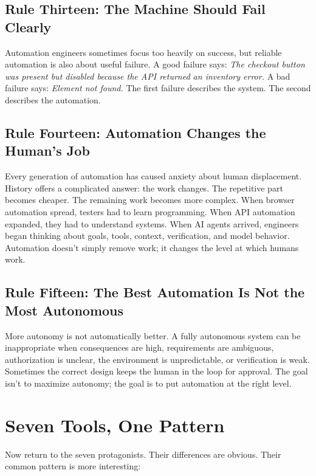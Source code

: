 \documentclass[11pt,twoside]{book}
\begin{document}
\section*{Rule Thirteen: The Machine Should Fail Clearly}

Automation engineers sometimes focus too heavily on success, but reliable automation is also about useful failure. A good failure says: \emph{The checkout button was present but disabled because the API returned an inventory error.} A bad failure says: \emph{Element not found.} The first failure describes the system. The second describes the automation.

\section*{Rule Fourteen: Automation Changes the Human's Job}

Every generation of automation has caused anxiety about human displacement. History offers a complicated answer: the work changes. The repetitive part becomes cheaper. The remaining work becomes more complex. When browser automation spread, testers had to learn programming. When API automation expanded, they had to understand systems. When AI agents arrived, engineers began thinking about goals, tools, context, verification, and model behavior. Automation doesn't simply remove work; it changes the level at which humans work.

\section*{Rule Fifteen: The Best Automation Is Not the Most Autonomous}

More autonomy is not automatically better. A fully autonomous system can be inappropriate when consequences are high, requirements are ambiguous, authorization is unclear, the environment is unpredictable, or verification is weak. Sometimes the correct design keeps the human in the loop for approval. The goal isn't to maximize autonomy; the goal is to put automation at the right level.

\chapter*{Seven Tools, One Pattern}

Now return to the seven protagonists. Their differences are obvious. Their common pattern is more interesting:
\end{document}
